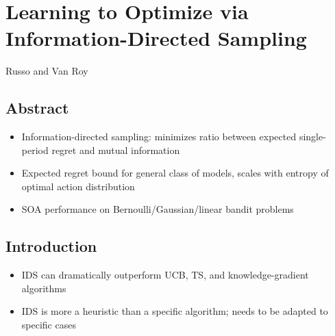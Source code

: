 \documentclass[11pt, openany]{book}
\begin{document}
\chapter*{Learning to Optimize via\\Information-Directed Sampling}
Russo and Van Roy \cite{InformationDirectedSampling}
\section{Abstract}
\begin{itemize}
    \item Information-directed sampling: minimizes ratio between expected single-period regret and mutual information
    \item Expected regret bound for general class of models, scales with entropy of optimal action distribution
    \item SOA performance on Bernoulli/Gaussian/linear bandit problems
\end{itemize}

\section{Introduction}
\begin{itemize}
    \item IDS can dramatically outperform UCB, TS, and knowledge-gradient algorithms
    \item IDS is more a heuristic than a specific algorithm; needs to be adapted to specific cases
\end{itemize}
\end{document}
